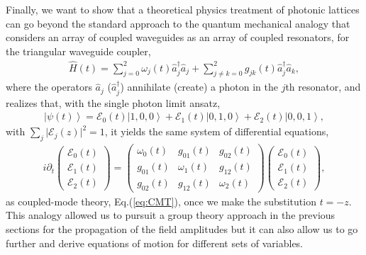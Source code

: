 \documentclass[9pt,twocolumn,twoside]{osajnl}
\begin{document}
Finally, we want to show that a theoretical physics treatment of photonic lattices can go beyond the standard approach to the quantum mechanical analogy that considers an array of coupled waveguides as an array of coupled resonators, for the triangular waveguide coupler,
\begin{eqnarray}\label{eq:qmHamiltonian}
	\hat{H}(t) = \sum_{j=0}^{2} \omega_j(t) \hat{a}^{\dagger}_j \hat{a}_{j} + \sum_{j\neq k=0}^{2} g_{jk}(t) \hat{a}^{\dagger}_j \hat{a}_k,
\end{eqnarray}
where the operators $\hat{a}_{j}$ ($\hat{a}_{j}^{\dagger}$) annihilate (create) a photon in the $j$th resonator, and realizes that, with the single photon limit ansatz,
\begin{eqnarray}\label{eq:sglPhoton}
	\left\vert \psi(t) \right\rangle = \mathcal{E}_{0}(t) \left\vert 1, 0, 0 \right\rangle  +
	\mathcal{E}_{1}(t) \left\vert 0,1,0 \right\rangle + \mathcal{E}_{2}(t) \left\vert 0,0,1 \right\rangle,
\end{eqnarray}
with $ \sum_{j} \vert \mathcal{E}_{j}(z) \vert^2 = 1$, it yields the same system of differential equations,
\begin{eqnarray} \label{eq:}
	i \partial_t	
	\left( \begin{array}{c} 
		\mathcal{E}_{0}(t) \\
		\mathcal{E}_{1}(t) \\
		\mathcal{E}_{2}(t)
	\end{array} \right) =
	\left( \begin{array}{ccc} 
		\omega_{0}(t)  & g_{01}(t) & g_{02}(t) \\
		g_{01}(t) & \omega_{1}(t) & g_{12}(t) \\
		g_{02}(t) & g_{12}(t) & \omega_{2}(t)
	\end{array} \right)
	\left( \begin{array}{c} 
		\mathcal{E}_{0}(t) \\
		\mathcal{E}_{1}(t) \\
		\mathcal{E}_{2}(t)
	\end{array} \right),
\end{eqnarray}
 as coupled-mode theory, Eq.(\ref{eq:CMT}), once we make the substitution $t=-z$. 
This analogy allowed us to pursuit a group theory approach in the previous sections for the propagation of the field amplitudes but it can also allow us to go further and derive equations of motion for different sets of variables.
\end{document}
